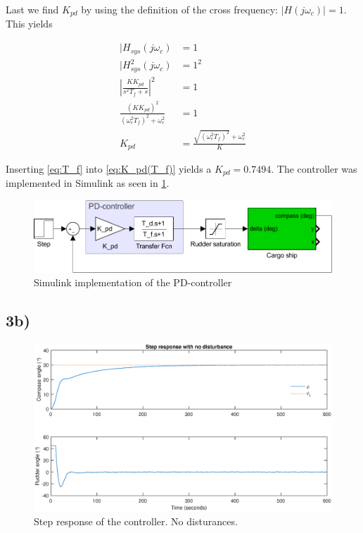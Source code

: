 Last we find $K_{pd}$ by using the definition of the cross frequency: $|H(j\omega_c)| = 1$. This yields

\begin{subequations}
    \begin{align}
        |H_{sys}(j\omega_c) &= 1 \\
        |H_{sys}^2(j\omega_c) &= 1^2 \\
        \left | \frac{KK_{pd}}{s^2T_f+s} \right |^2 &= 1 \\
        \frac{(KK_{pd})^2}{(\omega_c^2 T_f)^2 + \omega_c^2} &= 1 \\
        K_{pd} &= \frac{\sqrt{(\omega_c^2 T_f)^2} + \omega_c^2}{K} \label{eq:K_pd(T_f)}
    \end{align}
\end{subequations}

Inserting \cref{eq:T_f} into \cref{eq:K_pd(T_f)} yields a $K_{pd} = 0.7494$. The controller was implemented in Simulink as seen in \cref{fig:pd}.

\begin{figure}
    \centering
    \includegraphics[width=\textwidth]{images/oppg3/a_pd-loop.pdf}
    \caption{Simulink implementation of the PD-controller}
    \label{fig:pd}
\end{figure}

\subsection{3b)}


\begin{figure}
    \centering
    \includegraphics[width=\textwidth]{images/oppg3/stepresp_no_disturbance.eps}
    \caption{Step response of the controller. No disturances.}
    \label{fig:step_no_dist}
\end{figure}

